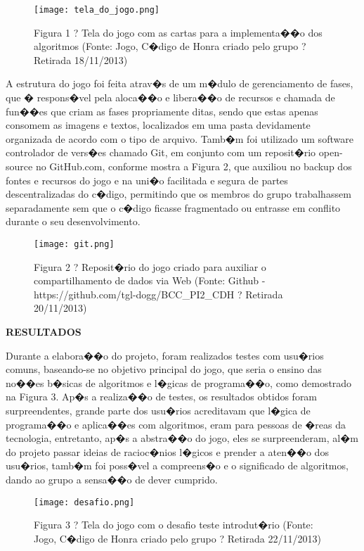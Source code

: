 \documentclass[a4paper]{article}
\begin{document}
\begin{figure}[!htb]
\centering
\texttt{[image: tela\_do\_jogo.png]}
\caption{Figura 1 ? Tela do jogo com as cartas para a implementa��o dos algoritmos (Fonte: Jogo, C�digo de Honra criado pelo grupo ? Retirada 18/11/2013)}
\label{Rotulo}
\end{figure}

A estrutura do jogo foi feita atrav�s de um m�dulo de gerenciamento de fases,
que � respons�vel pela aloca��o e libera��o de recursos e chamada de fun��es que criam
as fases propriamente ditas, sendo que estas apenas consomem as imagens e textos,
localizados em uma pasta devidamente organizada de acordo com o tipo de arquivo.
Tamb�m foi utilizado um software controlador de vers�es chamado Git, em
conjunto com um reposit�rio open-source no GitHub.com, conforme mostra a Figura 2,
que auxiliou no backup dos fontes e recursos do jogo e na uni�o facilitada e segura de
partes descentralizadas do c�digo, permitindo que os membros do grupo trabalhassem
separadamente sem que o c�digo ficasse fragmentado ou entrasse em conflito durante o
seu desenvolvimento.

\begin{figure}[!htb]
\centering
\texttt{[image: git.png]}
\caption{Figura 2 ? Reposit�rio do jogo criado para auxiliar o compartilhamento de dados via Web (Fonte: Github - https://github.com/tgl-dogg/BCC_PI2_CDH ? Retirada 20/11/2013)}
\label{Rotulo}
\end{figure}

\break

\begin{flushleft}
\textbf{\large RESULTADOS}
\end{flushleft}

Durante a elabora��o do projeto, foram realizados testes com usu�rios comuns,
baseando-se no objetivo principal do jogo, que seria o ensino das no��es b�sicas de
algoritmos e l�gicas de programa��o, como demostrado na Figura 3.
Ap�s a realiza��o de testes, os resultados obtidos foram surpreendentes, grande
parte dos usu�rios acreditavam que l�gica de programa��o e aplica��es com algoritmos,
eram para pessoas de �reas da tecnologia, entretanto, ap�s a abstra��o do jogo, eles se
surpreenderam, al�m do projeto passar ideias de racioc�nios l�gicos e prender a aten��o
dos usu�rios, tamb�m foi poss�vel a compreens�o e o significado de algoritmos, dando
ao grupo a sensa��o de dever cumprido.

\begin{figure}[!htb]
\centering
\texttt{[image: desafio.png]}
\caption{Figura 3 ? Tela do jogo com o desafio teste introdut�rio (Fonte: Jogo, C�digo de Honra criado pelo grupo ? Retirada 22/11/2013)}
\label{Rotulo}
\end{figure}
\end{document}
